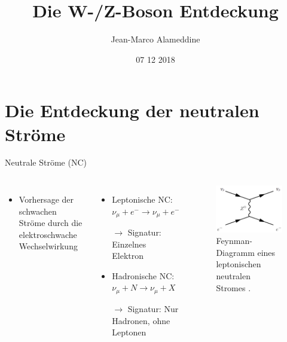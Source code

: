 \documentclass[aspectratio=1610, professionalfonts, 10pt]{beamer}
\title{Die W-/Z-Boson Entdeckung}
\author{Jean-Marco Alameddine}
\institute{TU Dortmund \\ Fakultät Physik}
\date{07 12 2018}
\begin{document}

\begin{frame}
	\maketitle %
\end{frame}


\section{Die Entdeckung der neutralen Ströme}

\begin{frame}{Neutrale Ströme (NC)}
	\begin{columns}
				\begin{itemize}
					  \setlength\itemsep{0.5em}
					\item Vorhersage der schwachen Ströme durch die elektroschwache Wechselwirkung
				\end{itemize}
				\vspace*{20px}
				\begin{itemize}
					\setlength\itemsep{0.5em}
					\item Leptonische NC: $\nu_\mu + e^- \rightarrow \nu_\mu + e^-$
					\item[$\rightarrow$] Signatur: Einzelnes Elektron
					\item Hadronische NC: $\nu_\mu + N \rightarrow \nu_\mu + X$
					\item[$\rightarrow$] Signatur: Nur Hadronen, ohne Leptonen
				\end{itemize}
			\begin{figure}
	  			\centering
				\includegraphics[width=\linewidth]{Images/Neutral_current,_leptonic_event,_muon_neutrino.png}
	  			\caption{Feynman-Diagramm eines leptonischen neutralen Stromes \cite{wiki:NC}.}
	  			\label{fig:feynman}
			\end{figure}
	\end{columns}
\end{frame}
\end{document}
